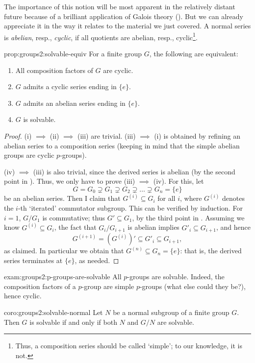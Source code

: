 The importance of this notion will be most apparent in the relatively
distant future because of a brilliant application of Galois theory
().
But we can already appreciate it in the way it relates to the material
we just covered. A normal series is \emph{abelian}, resp.,
\emph{cyclic}, if all quotients are abelian, resp.,
cyclic\footnote{Thus, a composition series should be called `simple';
  to our knowledge, it is not.}.
\begin{prop}{}{prop:groups2:solvable-equiv}
  For a finite group $G$, the following are equivalent:
  \begin{enumerate}[label=(\roman*)]
  \item All composition factors of $G$ are cyclic.
  \item $G$ admits a cyclic series ending in $\{e\}$.
  \item $G$ admits an abelian series ending in $\{e\}$.
  \item $G$ is solvable.
  \end{enumerate}
\end{prop}
\begin{proof}
  (i) $\implies$ (ii) $\implies$ (iii) are trivial. (iii) $\implies$
  (i) is obtained by refining an abelian series to a composition
  series (keeping in mind that the simple abelian groups are cyclic
  $p$-groups).

  (iv) $\implies$ (iii) is also trivial, since the derived series is
  abelian (by the second point in
  ).  Thus, we only have
  to prove (iii) $\implies$ (iv). For this, let
  \[
    G = G_0 \supsetneq G_1 \supsetneq G_2 \supsetneq \dots \supsetneq
    G_n = \{e\}
  \]
  be an abelian series. Then I claim that $G^{(i)} \subseteq G_i$ for
  all $i$, where $G^{(i)}$ denotes the $i$-th `iterated' commutator
  subgroup.  This can be verified by induction. For $i = 1$, $G/G_1$
  is commutative; thus $G' \subseteq G_1$, by the third point in
  . Assuming we know
  $G^{(i)} \subseteq G_i$, the fact that $G_i/G_{i+1}$ is abelian
  implies $G'_i \subseteq G_{i+1}$, and hence
  \[
    G^{(i+1)} = (G^{(i)})' \subseteq G'_i \subseteq G_{i+1},
  \]
  as claimed.  In particular we obtain that
  $G^{(n)} \subseteq G_n = \{e\}$: that is, the derived series
  terminates at $\{e\}$, as needed.
\end{proof}
\begin{exam}{}{exam:groups2:p-groups-are-solvable}
  All $p$-groups are solvable. Indeed, the composition factors of a
  $p$-group are simple $p$-groups (what else could they be?), hence
  cyclic.
\end{exam}
\begin{coro}{}{coro:groups2:solvable-normal}
  Let $N$ be a normal subgroup of a finite group $G$. Then $G$ is
  solvable if and only if both $N$ and $G/N$ are solvable.
\end{coro}

